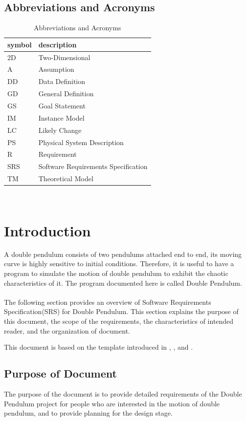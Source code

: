 \documentclass[12pt]{article}
\begin{document}
\subsection{Abbreviations and Acronyms}\label{sec_abbandacr}
\renewcommand{\arraystretch}{1.2}
\begin{table}[H]
  \centering
  \begin{tabular}{l l} 
    \toprule    
    \textbf{symbol} & \textbf{description}\\
    \midrule 
    2D & Two-Dimensional\\
    A & Assumption\\
    DD & Data Definition\\
    GD & General Definition\\
    GS & Goal Statement\\
    IM & Instance Model\\
    LC & Likely Change\\
    PS & Physical System Description\\
    R & Requirement\\
    SRS & Software Requirements Specification\\
    TM & Theoretical Model\\
    \bottomrule
  \end{tabular}\\
  \caption{Abbreviations and Acronyms}
\end{table}

\newpage
\section{Introduction}\label{sec_intro}
A double pendulum consists of two pendulums attached end to end, its moving curve is highly sensitive to initial conditions. Therefore, it is useful to have a program to simulate the motion of double pendulum to exhibit the chaotic characteristics of it. The program documented here is called Double Pendulum.\\\\The following section provides an overview of Software Requirements Specification(SRS) for Double Pendulum. This section explains the purpose of this document, the scope of the requirements, the characteristics of intended reader, and the organization of document. 

This document is based on the template introduced in \cite{Smith2006}, \cite{SmithAndLai2005}, and \cite{SmithMcCutchanAndCarette2017}.

\subsection{Purpose of Document}\label{sec_purpose}
The purpose of the document is to provide detailed requirements of the Double Pendulum project for people who are interested in the motion of double pendulum, and to provide planning for the design stage. 
\end{document}
